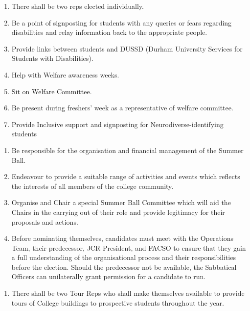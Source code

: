 \begin{enumerate}
    \item There shall be two reps elected individually. 
    \item Be a point of signposting for students with any queries or fears regarding disabilities and relay information back to the appropriate people.
    \item Provide links between students and DUSSD (Durham University Services for Students with Disabilities).
    \item Help with Welfare awareness weeks.
    \item Sit on Welfare Committee.
    \item Be present during freshers’ week as a representative of welfare committee.
    \item Provide Inclusive support and signposting for Neurodiverse-identifying students
    
\end{enumerate}

\begin{enumerate}
    \item Be responsible for the organisation and financial management of the Summer Ball.
    \item Endeavour to provide a suitable range of activities and events which reflects the interests of all members of the college community.
    \item Organise and Chair a special Summer Ball Committee which will aid the Chairs in the carrying out of their role and provide legitimacy for their proposals and actions.
    \item Before nominating themselves, candidates must meet with the Operations Team, their predecessor, JCR President, and FACSO to ensure that they gain a full understanding of the organisational process and their responsibilities before the election. Should the predecessor not be available, the Sabbatical Officers can unilaterally grant permission for a candidate to run. 
    
\end{enumerate}

\begin{enumerate}
    \item There shall be two Tour Reps who shall make themselves available to provide tours of College buildings to prospective students throughout the year.
    
\end{enumerate}

